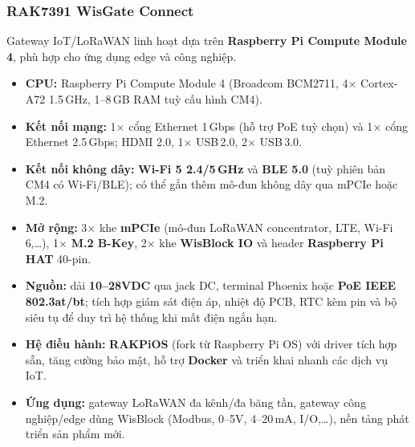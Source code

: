             \subsubsection*{RAK7391 WisGate Connect}
                Gateway IoT/LoRaWAN linh hoạt dựa trên \textbf{Raspberry Pi Compute Module 4}, phù hợp cho ứng dụng edge và công nghiệp.
                \begin{itemize}
                    \item \textbf{CPU:} Raspberry Pi Compute Module 4 (Broadcom BCM2711, 4$\times$ Cortex-A72 1{.}5\,GHz, 1--8\,GB RAM tuỳ cấu hình CM4).
                    \item \textbf{Kết nối mạng:} 1$\times$ cổng Ethernet 1\,Gbps (hỗ trợ PoE tuỳ chọn) và 1$\times$ cổng Ethernet 2{.}5\,Gbps; HDMI 2{.}0, 1$\times$ USB\,2{.}0, 2$\times$ USB\,3{.}0.
                    \item \textbf{Kết nối không dây:} \textbf{Wi-Fi 5 2{.}4/5\,GHz} và \textbf{BLE 5{.}0} (tuỳ phiên bản CM4 có Wi-Fi/BLE); có thể gắn thêm mô-đun không dây qua mPCIe hoặc M.2.
                    \item \textbf{Mở rộng:} 3$\times$ khe \textbf{mPCIe} (mô-đun LoRaWAN concentrator, LTE, Wi-Fi 6,\dots), 1$\times$ \textbf{M.2 B-Key}, 2$\times$ khe \textbf{WisBlock IO} và header \textbf{Raspberry Pi HAT} 40-pin.
                    \item \textbf{Nguồn:} dải \textbf{10--28VDC} qua jack DC, terminal Phoenix hoặc \textbf{PoE IEEE 802{.}3at/bt}; tích hợp giám sát điện áp, nhiệt độ PCB, RTC kèm pin và bộ siêu tụ để duy trì hệ thống khi mất điện ngắn hạn.
                    \item \textbf{Hệ điều hành:} \textbf{RAKPiOS} (fork từ Raspberry Pi OS) với driver tích hợp sẵn, tăng cường bảo mật, hỗ trợ \textbf{Docker} và triển khai nhanh các dịch vụ IoT.
                    \item \textbf{Ứng dụng:} gateway LoRaWAN đa kênh/đa băng tần, gateway công nghiệp/edge dùng WisBlock (Modbus, 0--5V, 4--20\,mA, I/O,\dots), nền tảng phát triển sản phẩm mới.
                \end{itemize}
            

